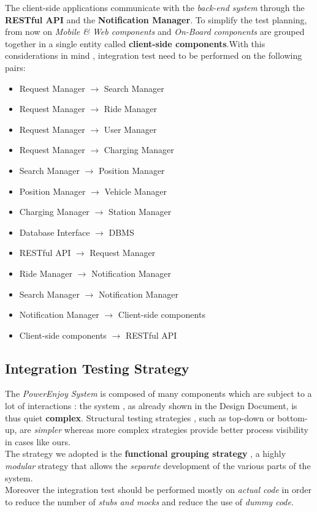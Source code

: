 The client-side applications communicate with the \emph{back-end system} through the \textbf{RESTful API} and the \textbf{Notification Manager}. To simplify the test planning, from now on \emph{Mobile \& Web components} and \emph{On-Board components} are grouped together in a single entity called \textbf{client-side components}.With this considerations in mind , integration test need to be performed on the following pairs:
\begin{itemize}
\item Request Manager $\rightarrow$ Search Manager
\item Request Manager $\rightarrow$ Ride Manager
\item Request Manager $\rightarrow$ User Manager
\item Request Manager $\rightarrow$ Charging Manager
\item Search Manager $\rightarrow$ Position Manager
\item Position Manager $\rightarrow$ Vehicle Manager
\item Charging Manager $\rightarrow$ Station Manager
\item Database Interface $\rightarrow$ DBMS
\item RESTful API $\rightarrow$ Request Manager
\item Ride Manager $\rightarrow$ Notification Manager
\item Search Manager $\rightarrow$ Notification Manager
\item Notification Manager $\rightarrow$ Client-side components
\item Client-side components $\rightarrow$ RESTful API
\end{itemize}

\subsection{Integration Testing Strategy}
The \emph{PowerEnjoy System} is composed of many components which are subject to a lot of interactions : the system , as already shown in the Design Document, is thus quiet \textbf{complex}. Structural testing strategies , such as top-down or bottom-up, are \emph{simpler} whereas more complex strategies provide better process visibility in cases like ours.\\
The strategy we adopted is the \textbf{functional grouping strategy} , a highly \emph{modular} strategy that allows the \emph{separate} development of the various parts of the system.\\
Moreover the integration test should be performed mostly on \emph{actual code} in order to reduce the number of \emph{stubs and mocks} and reduce the use of \emph{dummy code}.

